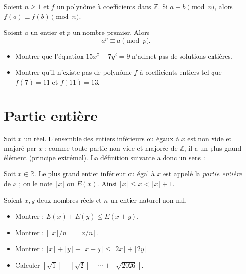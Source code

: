 \begin{fact}
	Soient $n \geq 1$ et $f$ un polynôme à coefficients dans $\mathbb{Z}$. Si $a \equiv b \pmod{n}$, alors $f(a) \equiv f(b) \pmod{n}$.
\end{fact}

\begin{fact}
	Soient $a$ un entier et $p$ un nombre premier. Alors
	\[
	a^p \equiv a \pmod{p}.
	\]
\end{fact}

\begin{exercise}
	\begin{itemize}
		\item[$\bullet$] Montrer que l'équation $15x^2 - 7y^2 = 9$ n'admet pas de solutions entières.
		\item[$\bullet$] Montrer qu'il n'existe pas de polynôme $f$ à coefficients entiers tel que $f(7) = 11$ et
		$f(11) = 13$.
	\end{itemize}
\end{exercise}

\section{Partie entière}

Soit $x$ un réel. L'ensemble des entiers inférieurs ou égaux à $x$ est non vide et majoré par $x$ ; comme toute partie non vide et majorée de $\mathbb{Z}$, il a un plus grand élément (principe extrémal). La définition suivante a donc un sens :
\begin{defi}
	Soit $x \in \mathbb{R}$. Le plus grand entier inférieur ou égal à $x$ est appelé la \textit{partie entière} de $x$ ; on le note $\lfloor x \rfloor$ ou $E(x).$ Ainsi $\lfloor x \rfloor \leq x < \lfloor x \rfloor + 1.$
\end{defi}

\begin{exercise} Soient $x, y$ deux nombres réels et $n$ un entier naturel non nul.
	\begin{itemize}
		\item[$\bullet$] Montrer : $E(x) + E(y) \leq E(x + y)$.
		\item[$\bullet$] Montrer : $\lfloor \lfloor x \rfloor / n \rfloor = \lfloor x/n \rfloor$.
		\item[$\bullet$] Montrer : $\lfloor x \rfloor + \lfloor y \rfloor + \lfloor x + y \rfloor \leq \lfloor 2x \rfloor + \lfloor 2y \rfloor$.
		\item[$\bullet$] Calculer $\left\lfloor \sqrt{1} \right\rfloor + \left\lfloor \sqrt{2} \right\rfloor + \cdots + \left\lfloor \sqrt{2026} \right\rfloor$.
	\end{itemize}
\end{exercise}

